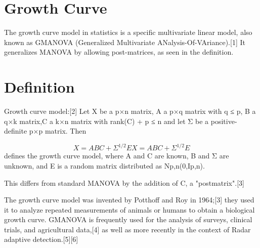 
\section*{Growth Curve}
The growth curve model in statistics is a specific multivariate linear model, also known as GMANOVA (Generalized Multivariate ANalysis-Of-VAriance).[1] It generalizes MANOVA by allowing post-matrices, as seen in the definition.


\section*{Definition}
Growth curve model:[2] Let X be a p×n matrix, A a p×q matrix with q ≤ p, B a q×k matrix,C a k×n matrix with rank(C) + p ≤ n and let Σ be a positive-definite p×p matrix. Then

\[{\displaystyle X=ABC+\Sigma ^{1/2}E} X=ABC+\Sigma^{1/2}E\]
defines the growth curve model, where A and C are known, B and Σ are unknown, and E is a random matrix distributed as Np,n(0,Ip,n).

This differs from standard MANOVA by the addition of C, a "postmatrix".[3]



The growth curve model was invented by Potthoff and Roy in 1964;[3] they used it to analyze repeated measurements of animals or humans to obtain a biological growth curve.
GMANOVA is frequently used for the analysis of surveys, clinical trials, and agricultural data,[4] as well as more recently in the context of Radar adaptive detection.[5][6]
